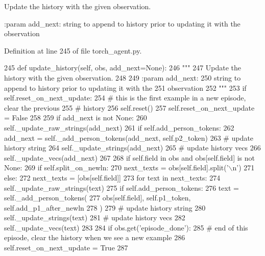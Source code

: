 \begin{DoxyVerb}Update the history with the given observation.

:param add_next:
    string to append to history prior to updating it with the
    observation
\end{DoxyVerb}
 

Definition at line 245 of file torch\+\_\+agent.\+py.


\begin{DoxyCode}
245     \textcolor{keyword}{def }update\_history(self, obs, add\_next=None):
246         \textcolor{stringliteral}{"""}
247 \textcolor{stringliteral}{        Update the history with the given observation.}
248 \textcolor{stringliteral}{}
249 \textcolor{stringliteral}{        :param add\_next:}
250 \textcolor{stringliteral}{            string to append to history prior to updating it with the}
251 \textcolor{stringliteral}{            observation}
252 \textcolor{stringliteral}{        """}
253         \textcolor{keywordflow}{if} self.reset\_on\_next\_update:
254             \textcolor{comment}{# this is the first example in a new episode, clear the previous}
255             \textcolor{comment}{# history}
256             self.reset()
257             self.reset\_on\_next\_update = \textcolor{keyword}{False}
258 
259         \textcolor{keywordflow}{if} add\_next \textcolor{keywordflow}{is} \textcolor{keywordflow}{not} \textcolor{keywordtype}{None}:
260             self.\_update\_raw\_strings(add\_next)
261             \textcolor{keywordflow}{if} self.add\_person\_tokens:
262                 add\_next = self.\_add\_person\_tokens(add\_next, self.p2\_token)
263             \textcolor{comment}{# update history string}
264             self.\_update\_strings(add\_next)
265             \textcolor{comment}{# update history vecs}
266             self.\_update\_vecs(add\_next)
267 
268         \textcolor{keywordflow}{if} self.field \textcolor{keywordflow}{in} obs \textcolor{keywordflow}{and} obs[self.field] \textcolor{keywordflow}{is} \textcolor{keywordflow}{not} \textcolor{keywordtype}{None}:
269             \textcolor{keywordflow}{if} self.split\_on\_newln:
270                 next\_texts = obs[self.field].split(\textcolor{stringliteral}{'\(\backslash\)n'})
271             \textcolor{keywordflow}{else}:
272                 next\_texts = [obs[self.field]]
273             \textcolor{keywordflow}{for} text \textcolor{keywordflow}{in} next\_texts:
274                 self.\_update\_raw\_strings(text)
275                 \textcolor{keywordflow}{if} self.add\_person\_tokens:
276                     text = self.\_add\_person\_tokens(
277                         obs[self.field], self.p1\_token, self.add\_p1\_after\_newln
278                     )
279                 \textcolor{comment}{# update history string}
280                 self.\_update\_strings(text)
281                 \textcolor{comment}{# update history vecs}
282                 self.\_update\_vecs(text)
283 
284         \textcolor{keywordflow}{if} obs.get(\textcolor{stringliteral}{'episode\_done'}):
285             \textcolor{comment}{# end of this episode, clear the history when we see a new example}
286             self.reset\_on\_next\_update = \textcolor{keyword}{True}
287 
\end{DoxyCode}


